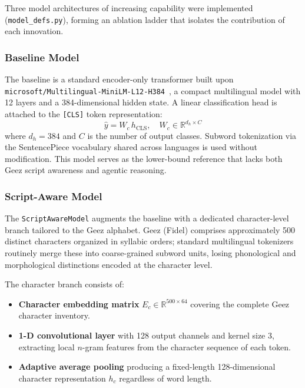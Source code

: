 Three model architectures of increasing capability were implemented (\texttt{model\_defs.py}),
forming an ablation ladder that isolates the contribution of each innovation.

\subsubsection{Baseline Model}

The baseline is a standard encoder-only transformer built upon
\texttt{microsoft/Multilingual-MiniLM-L12-H384}~\cite{wang2020minilm}, a compact multilingual
model with 12 layers and a 384-dimensional hidden state.  A linear classification head is
attached to the \texttt{[CLS]} token representation:
%
\begin{equation}
  \hat{y} = W_c \, h_{\text{CLS}}, \quad W_c \in \mathbb{R}^{d_h \times C}
  \label{eq:baseline_cls}
\end{equation}
%
where $d_h = 384$ and $C$ is the number of output classes.  Subword tokenization via the
SentencePiece vocabulary shared across languages is used without modification.  This model
serves as the lower-bound reference that lacks both Ge\textquotesingle ez script awareness and
agentic reasoning.

\subsubsection{Script-Aware Model}

The \texttt{ScriptAwareModel} augments the baseline with a dedicated character-level branch
tailored to the Ge\textquotesingle ez alphabet.  Ge\textquotesingle ez (Fidel) comprises
approximately 500 distinct characters organized in syllabic orders; standard multilingual
tokenizers routinely merge these into coarse-grained subword units, losing phonological and
morphological distinctions encoded at the character level.

The character branch consists of:
\begin{itemize}
  \item \textbf{Character embedding matrix} $E_c \in \mathbb{R}^{500 \times 64}$ covering the
        complete Ge\textquotesingle ez character inventory.
  \item \textbf{1-D convolutional layer} with 128 output channels and kernel size 3,
        extracting local $n$-gram features from the character sequence of each token.
  \item \textbf{Adaptive average pooling} producing a fixed-length 128-dimensional character
        representation $h_c$ regardless of word length.
\end{itemize}

